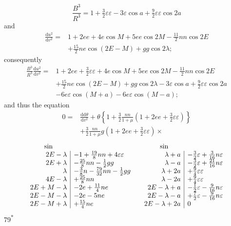\[
\frac{B^3}{R^3}=1+\tfrac32\varepsilon\varepsilon-3\varepsilon\cos a
+\tfrac92\varepsilon\varepsilon\cos2a
\]
\noindent and
\[
\begin{aligned}
\frac{\mathrm{d}u^2}{\mathrm{d}v^2}={}&1+2ee+4e\cos M+5ee\cos2M
-\tfrac{11}{2}nn\cos2E\\
&+\tfrac{15}{2}ne\cos(2E-M)+gg\cos2\lambda;
\end{aligned}
\]
\noindent consequently
\[
\begin{aligned}
\frac{B^3}{R^3}\frac{\mathrm{d}u^2}{\mathrm{d}v^2}
={}&1+2ee+\tfrac32\varepsilon\varepsilon+4e\cos M+5ee\cos2M
-\tfrac{11}{2}nn\cos2E\\
&+\tfrac{15}{2}ne\cos(2E-M)+gg\cos2\lambda
-3\varepsilon\cos a+\tfrac92\varepsilon\varepsilon\cos2a\\
&-6e\varepsilon\cos(M+a)-6e\varepsilon\cos(M-a);
\end{aligned}
\]
\noindent and thus the equation
\[
\begin{aligned}
0={}&\frac{\mathrm{dd}\theta}{\mathrm{d}v^2}
+\theta\left\{1+\frac32\frac{nn}{1+\mu}(1+2ee+\tfrac32\varepsilon\varepsilon)\right\}\\
&+\frac32\frac{nn}{1+\mu}g(1+2ee+\tfrac32\varepsilon\varepsilon)\times
\end{aligned}
\]
\begingroup\small
\setlength{\arraycolsep}{3pt}\renewcommand{\arraystretch}{1.5}
\[
\begin{array}{r|l@{\qquad}r|l}
\multicolumn{1}{c}{\sin}& &\multicolumn{1}{c}{\sin}&\\
2E-\lambda&-1+\tfrac{19}{8}nn+4\varepsilon\varepsilon
 &\lambda+a&-\tfrac32\varepsilon+\tfrac{3}{16}n\varepsilon\\
2E+\lambda&-\tfrac{25}{8}nn-\tfrac12gg
 &\lambda-a&-\tfrac32\varepsilon+\tfrac{21}{16}n\varepsilon\\
\lambda&-\tfrac38n-\tfrac{79}{32}nn-\tfrac12gg
 &\lambda+2a&+\tfrac94\varepsilon\varepsilon\\
4E-\lambda&+\tfrac{25}{8}nn
 &\lambda-2a&+\tfrac94\varepsilon\varepsilon\\
2E+M-\lambda&-2e+\tfrac{11}{4}ne
 &2E-\lambda+a&-\tfrac12\varepsilon-\tfrac{9}{16}n\varepsilon\\
2E-M-\lambda&-2e-5ne
 &2E-\lambda-a&+\tfrac72\varepsilon-\tfrac{9}{16}n\varepsilon\\
2E-M+\lambda&+\tfrac{15}{4}ne
 &2E-\lambda+2a&0
\end{array}
\]
\endgroup
\noindent\hfill79\textsuperscript{*}\par
{}

